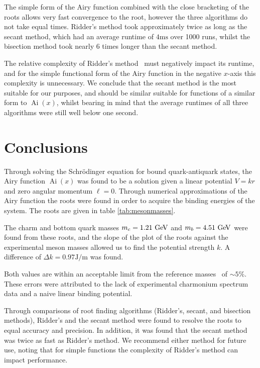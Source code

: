 \documentclass[]{article}
\newcommand{\Ai}[1]{\ensuremath{\operatorname{Ai}({#1})}}
\begin{document}
The simple form of the Airy function combined with the close bracketing of the roots allows very fast convergence to the root, however the three algorithms do not take equal times. Ridder's method took approximately twice as long as the secant method, which had an average runtime of $4\si{\milli\second}$ over 1000 runs, whilst the bisection method took nearly 6 times longer than the secant method.

The relative complexity of Ridder's method~\cite{ref:nr} must negatively impact its runtime, and for the simple functional form of the Airy function in the negative $x$-axis this complexity is unnecessary. We conclude that the secant method is the most suitable for our purposes, and should be similar suitable for functions of a similar form to \Ai{x}, whilst bearing in mind that the average runtimes of all three algorithms were still well below one second.

\section{Conclusions}\label{sec:conclusion}

Through solving the Schr\"{o}dinger equation for bound quark-antiquark states, the Airy function \Ai{x} was found to be a solution given a linear potential $V = kr$ and zero angular momentum $\ell = 0$. Through numerical approximations of the Airy function the roots were found in order to acquire the binding energies of the \qqbar system. The roots are given in table \ref{tab:mesonmasses}.

The charm and bottom quark masses $m_{c} = 1.21\GeV$ and $m_{b} = 4.51\GeV$ were found from these roots, and the slope of the plot of the roots against the experimental meson masses allowed us to find the potential strength $k$. A difference of $\Delta k = 0.97 \si{\joule\per\metre}$ was found.

Both values are within an acceptable limit from the reference masses~\cite{ref:pdg} of $\sim 5\%$. These errors were attributed to the lack of experimental charmonium spectrum data and a naive linear binding potential. 

Through comparisons of root finding algorithms (Ridder's, secant, and bisection methods), Ridder's and the secant method were found to resolve the roots to equal accuracy and precision. In addition, it was found that the secant method was twice as fast as Ridder's method. We recommend either method for future use, noting that for simple functions the complexity of Ridder's method can impact performance.
\end{document}
